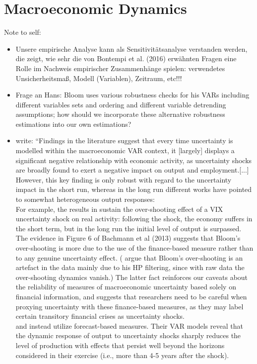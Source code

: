 \documentclass[a4paper,11pt,listof=nochaptergap,oneside,pointednumbers,bibtotoc,bigheadings,liststotoc]{scrbook}
\begin{document}
\chapter{Macroeconomic Dynamics}
\label{sec:EmpiricalAnalysis}
\begingroup
    \fontsize{8pt}{12pt}\selectfont
    Note to self:
\begin{itemize}
	\item Unsere empirische Analyse kann als Sensitivitätsanalyse verstanden werden, die zeigt, wie sehr die von Bontempi et al. (2016) erwähnten Fragen eine Rolle im Nachweis empirischer Zusammenhänge spielen: verwendetes Unsicherheitsmaß, Modell (Variablen), Zeitraum, etc!!!
	\item Frage an Hans: Bloom uses various robustness checks for his VARs including different variables sets and ordering and different variable detrending assumptions; how should we incorporate these alternative robustness estimations into our own estimations?
	\item \citet{bontempietal:16} write: ``Findings in the literature suggest that every time uncertainty is modelled within the macroeconomic VAR context, it [largely] displays a significant negative relationship with economic activity, as uncertainty shocks are broadly found to exert a negative impact on output and employment.[...] \\
	However, this key finding is only robust with regard to the uncertainty impact in the short run, whereas in the long run different works have pointed to somewhat heterogeneous output responses:\\
	For example, the results in \citet{bloom:09} sustain the over-shooting effect of a VIX uncertainty shock on real activity: following the shock, the economy suffers in the short term, but in the long run the initial level of output is surpassed. The evidence in Figure 6 of Bachmann et al (2013) suggests that Bloom's over-shooting is more due to the use of the finance-based measure rather than to any genuine uncertainty effect. (\citet{juradoetal:15} argue that Bloom's over-shooting is an artefact in the data mainly due to his HP filtering, since with raw data the over-shooting dynamics vanish.) The latter fact reinforces our caveats about the reliability of measures of macroeconomic uncertainty based solely on financial information, and suggests that researchers need to be careful when proxying uncertainty with these finance-based measures, as they may label certain transitory financial crises as uncertainty shocks.\\
	\citet{juradoetal:15} and \citet{bachmannetal:13} instead utilize forecast-based measures. Their VAR models reveal that the dynamic response of output to uncertainty shocks sharply reduces the level of production with effects that persist well beyond the horizons considered in their exercise (i.e., more than 4-5 years after the shock).\\

\end{itemize}
\end{document}

